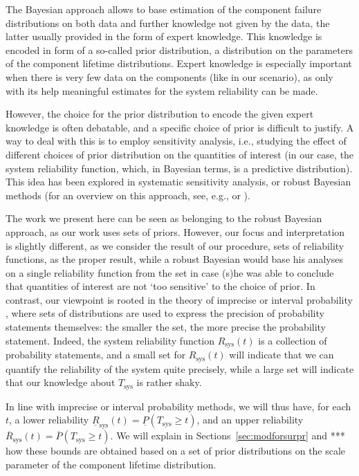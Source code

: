 \documentclass[Journal,SectionNumbers,SingleSpace,InsideFigs]{ascelike}
\newcommand{\ul}[1]{\underline{#1}}
\newcommand{\ol}[1]{\overline{#1}}
\newcommand{\Rsys}{R_\text{sys}}
\newcommand{\lRsys}{\ul{R}_\text{sys}}
\newcommand{\uRsys}{\ol{R}_\text{sys}}
\def\Rsys{R_\text{sys}}
\def\Tsys{T_\text{sys}}
\begin{document}
The Bayesian approach allows to base estimation of the component failure distributions
on both data and further knowledge not given by the data,
the latter usually provided in the form of expert knowledge.
This knowledge is encoded in form of a so-called prior distribution,
a distribution on the parameters of the component lifetime distributions.
Expert knowledge is especially important when there is very few data on the components (like in our scenario),
as only with its help meaningful estimates for the system reliability can be made.

However, the choice for the prior distribution to encode the given expert knowledge is often debatable,
and a specific choice of prior is difficult to justify.
A way to deal with this is to employ sensitivity analysis,
i.e., studying the effect of different choices of prior distribution on the quantities of interest
(in our case, the system reliability function, which, in Bayesian terms, is a predictive distribution).
This idea has been explored in systematic sensitivity analysis, or robust Bayesian methods
(for an overview on this approach, see, e.g.,
 or ). %

The work we present here can be seen as belonging to the robust Bayesian approach,
as our work uses sets of priors. However, our focus and interpretation is slightly different,
as we consider the result of our procedure, sets of reliability functions, as the proper result,
while a robust Bayesian would base his analyses on a single reliability function from the set
in case (s)he was able to conclude that quantities of interest are not `too sensitive' to the choice of prior.
In contrast, our viewpoint is rooted in the theory of imprecise or interval probability \cite{1991:walley,itip},
where sets of distributions are used to express the precision of probability statements themselves:
the smaller the set, the more precise the probability statement.
Indeed, the system reliability function $\Rsys(t)$ is a collection of probability statements,
and a small set for $\Rsys(t)$ will indicate that we can quantify the reliability of the system quite precisely,
while a large set will indicate that our knowledge about $\Tsys$ is rather shaky.

In line with imprecise or interval probability methods, we will thus have, for each $t$,
a lower reliability $\lRsys(t) = \ul{P}(T_\text{sys} \geq t)$,
and an upper reliability $\uRsys(t) = \ol{P}(T_\text{sys} \geq t)$.
We will explain in Sections~\ref{sec:modforsurpr} and *** how these bounds are obtained
based on a set of prior distributions on the scale parameter of the component lifetime distribution.
\end{document}
